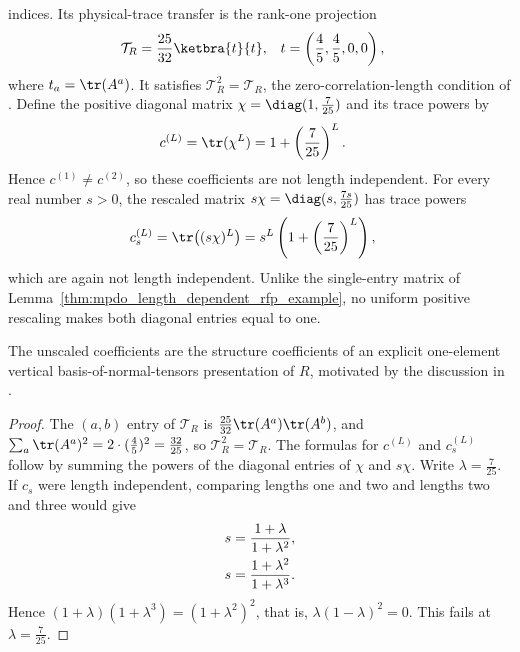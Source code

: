 \begin{lemma}
    indices. Its physical-trace transfer is the rank-one projection
    \begin{align}
        \mathcal T_R & =\frac{25}{32}\ketbra{t}{t},       &
        t            & =\left(\frac45,\frac45,0,0\right),
        \notag
    \end{align}
    where $t_a=\tr(A^a)$. It satisfies $\mathcal T_R^2=\mathcal T_R$,
    the zero-correlation-length condition of
    \cite[Definition~4.2, lines~736--741]{Cirac2016MPDO_arXiv}.
    Define the positive diagonal matrix
    $\chi=\diag(1,\frac{7}{25})$ and its trace powers by
    \begin{align}
        c^{(L)} & =\tr(\chi^L)=1+\left(\frac{7}{25}\right)^L.
        \notag
    \end{align}
    Hence $c^{(1)}\ne c^{(2)}$, so these coefficients are not length
    independent. For every real number $s>0$, the rescaled matrix
    $s\chi=\diag(s,\frac{7s}{25})$ has trace powers
    \begin{align}
        c_s^{(L)} & =\tr\!\left((s\chi)^L\right)
        =s^L\left(1+\left(\frac{7}{25}\right)^L\right),
        \notag
    \end{align}
    which are again not length independent. Unlike the single-entry
    matrix of Lemma~\ref{thm:mpdo_length_dependent_rfp_example}, no
    uniform positive rescaling makes both diagonal entries equal to one.

    The unscaled coefficients are the structure coefficients of an explicit
    one-element vertical basis-of-normal-tensors presentation of $R$,
    motivated by the discussion in \cite[lines~995--1010]{Cirac2016MPDO_arXiv}.
\end{lemma}
\begin{proof}\leanok
    The $(a,b)$ entry of $\mathcal T_R$ is
    $\frac{25}{32}\tr(A^a)\tr(A^b)$, and
    $\sum_a\tr(A^a)^2=2\cdot(\frac45)^2=\frac{32}{25}$,
    so $\mathcal T_R^2=\mathcal T_R$. The formulas for $c^{(L)}$ and
    $c_s^{(L)}$ follow by summing the powers of the diagonal entries of
    $\chi$ and $s\chi$.
    Write $\lambda=\frac{7}{25}$. If $c_s$ were length independent,
    comparing lengths one and two and lengths two and three would give
    \begin{align}
        s & =\frac{1+\lambda}{1+\lambda^2},
        \notag                                \\
        s & =\frac{1+\lambda^2}{1+\lambda^3}.
        \notag
    \end{align}
    Hence $(1+\lambda)(1+\lambda^3)=(1+\lambda^2)^2$, that is,
    $\lambda(1-\lambda)^2=0$. This fails at $\lambda=\frac{7}{25}$.
\end{proof}

